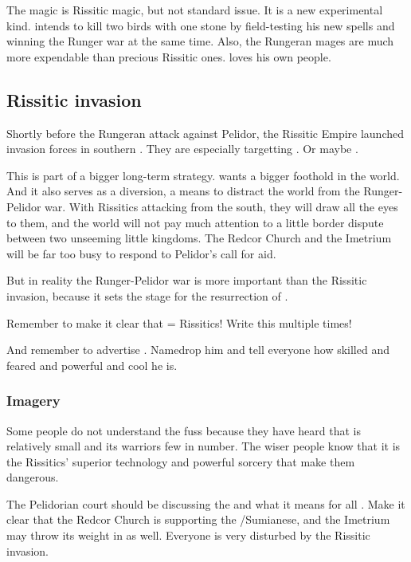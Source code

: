 The \EreshKali{} magic is Rissitic magic, but not standard issue. 
It is a new experimental kind. 
\Secherdamon{} intends to kill two birds with one stone by field-testing his new spells and winning the Runger war at the same time. 
Also, the Rungeran mages are much more expendable than precious Rissitic ones. 
\Secherdamon{} loves his own people. 









\subsection{Rissitic invasion}
Shortly before the Rungeran attack against Pelidor, the Rissitic Empire launched invasion forces in southern \Galessan. 
They are especially targetting . 
Or maybe \Scyrum. 

This is part of a bigger long-term strategy. 
\Secherdamon{} wants a bigger foothold in the world. 
And it also serves as a diversion, a means to distract the world from the Runger-Pelidor war. 
With Rissitics attacking from the south, they will draw all the eyes to them, and the world will not pay much attention to a little border dispute between two unseeming little kingdoms. 
The Redcor Church and the Imetrium will be far too busy to respond to Pelidor's call for aid. 

But in reality the Runger-Pelidor war is more important than the Rissitic invasion, because it sets the stage for the resurrection of \Nithdornazsh. 

Remember to make it clear that \Durcac = Rissitics! 
Write this multiple times! 

And remember to advertise . 
Namedrop him and tell everyone how skilled and feared and powerful and cool he is. 





\subsubsection{Imagery}
Some people do not understand the fuss because they have heard that \Durcac is relatively small and its warriors few in number.
The wiser people know that it is the Rissitics' superior technology and powerful sorcery that make them dangerous.

The Pelidorian court should be discussing the  and what it means for all \Galessan. 
Make it clear that the Redcor Church is supporting the \Scyrics/Sumianese, and the Imetrium may throw its weight in as well. 
Everyone is very disturbed by the Rissitic invasion. 


